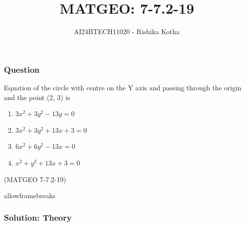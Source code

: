 \documentclass{beamer}
\begin{document}
\title{MATGEO: 7-7.2-19}
\author{AI24BTECH11020 - Rishika Kotha$^{}$%
}
\frame{\titlepage}

\begin{frame}
\frametitle{Question}
Equation of the circle with centre on the Y axis and passing through the origin and the point (2, 3) is
 \\
\begin{enumerate}
    \item $3x^2+3y^2-13y=0$
    \item $3x^2+3y^2+13x+3=0$
    \item $6x^2+6y^2-13x=0$
    \item $x^2+y^2+13x+3=0$
\end{enumerate} \hfill(MATGEO 7-7.2-19)
\end{frame}


\begin{frame}{allowframebreaks}
\frametitle{Solution: Theory}
        \begin{table}[h!]
    \centering
    
    \label{7-7.2-19}
        \end{table}
\end{frame}
\end{document}
